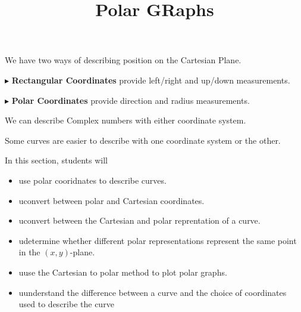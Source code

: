 \documentclass{ximera}
\title{Polar GRaphs}
\begin{document}
\begin{abstract}
\end{abstract}
\maketitle





We have two ways of describing position on the Cartesian Plane.


$\blacktriangleright$ \textbf{Rectangular Coordinates} provide left/right and up/down measurements.





$\blacktriangleright$ \textbf{Polar Coordinates} provide direction and radius measurements.




We can describe Complex numbers with either coordinate system.


Some curves are easier to describe with one coordinate system or the other.




\begin{sectionOutcomes}
In this section, students will 

\begin{itemize}
\item use polar cooridnates to describe curves.
\item uconvert between polar and Cartesian coordinates.
\item uconvert between the Cartesian and polar reprentation of a curve.
\item udetermine whether different polar representations represent the same point in the $(x,y)$-plane.
\item uuse the Cartesian to polar method to plot polar graphs.
\item uunderstand the difference between a curve and the choice of coordinates used to describe the curve
\end{itemize}
\end{sectionOutcomes}
\end{document}
